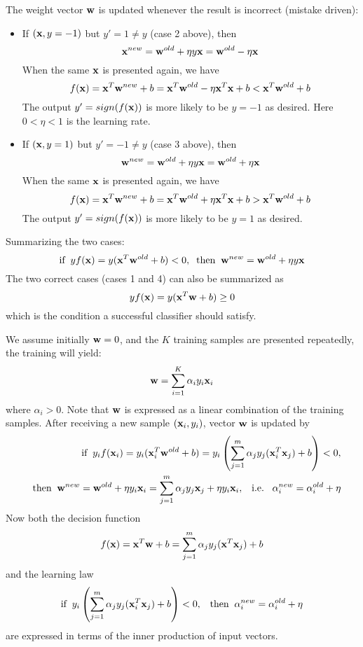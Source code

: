 The weight vector ${\bf w}$ is updated whenever the result is incorrect (mistake
driven):

\begin{itemize} 
\item If $({\bf x},y=-1)$ but $y'=1\ne y$ (case 2 above), then
  \[ {\bf x}^{new}={\bf w}^{old}+\eta y {\bf x}={\bf w}^{old}-\eta {\bf x}	\]
  When the same ${\bf x}$ is presented again, we have
  \[ f({\bf x})={\bf x}^T{\bf w}^{new}+b
  ={\bf x}^T{\bf w}^{old}-\eta {\bf x}^T{\bf x}+b<{\bf x}^T{\bf w}^{old}+b \]
  The output $y'=sign(f({\bf x}))$ is more likely to be $y=-1$ as desired. 
  Here $0 < \eta < 1$ is the learning rate.
\item If $({\bf x},y=1)$ but $y'=-1\ne y$ (case 3 above), then
  \[ {\bf w}^{new}={\bf w}^{old}+\eta y {\bf x}={\bf w}^{old}+\eta {\bf x}	\]
  When the same ${\bf x}$ is presented again, we have
  \[ f({\bf x})={\bf x}^T{\bf w}^{new}+b={\bf x}^T{\bf w}^{old}+\eta {\bf x}^T{\bf x}+b>{\bf x}^T{\bf w}^{old}+b \]
  The output $y'=sign(f({\bf x}))$ is more likely to be $y=1$ as desired.
\end{itemize}
Summarizing the two cases:
\[
\mbox{if} \;\;y f({\bf x})= y ({\bf x}^T{\bf w}^{old}+b)<0,\;\;\mbox{then}\;\;
     {\bf w}^{new}={\bf w}^{old}+\eta y {\bf x}	
\]
The two correct cases (cases 1 and 4) can also be summarized as
\[
y f({\bf x})= y ({\bf x}^T {\bf w}+b)\ge 0	
\]
which is the condition a successful classifier should satisfy.

We assume initially ${\bf w}=0$, and the $K$ training samples are presented
repeatedly, the training will yield:
\[
  {\bf w}=\sum_{i=1}^K \alpha_i y_i {\bf x}_i
\]
where $\alpha_i>0$. Note that ${\bf w}$ is expressed as a linear combination of 
the training samples. After receiving a new sample $({\bf x}_i,y_i)$, vector 
${\bf w}$ is updated by 
\begin{eqnarray}
  && \mbox{if} \;\;y_i f({\bf x}_i)=y_i ({\bf x}_i^T{\bf w}^{old}+b)
  =y_i\left(\sum_{j=1}^m \alpha_j y_j({\bf x}_i^T{\bf x}_j)+b\right)<0,
  \nonumber \\
  && \mbox{then}\;\; {\bf w}^{new}={\bf w}^{old}+\eta y_i {\bf x}_i
  =\sum_{j=1}^m \alpha_j y_j {\bf x}_j+\eta y_i {\bf x}_i,\;\;\;\mbox{i.e.}\;\;\;
  \alpha_i^{new}=\alpha_i^{old}+\eta	\nonumber
\end{eqnarray}
Now both the decision function
\[ 
f({\bf x})={\bf x}^T {\bf w}+b=\sum_{j=1}^m \alpha_j y_j ({\bf x}^T {\bf x}_j)+b	
\]
and the learning law 
\[
\mbox{if} \;\;y_i\left(\sum_{j=1}^m \alpha_j y_j({\bf x}_i^T{\bf x}_j)+b\right)<0,
\;\;\;	\mbox{then}\;\; \alpha_i^{new}=\alpha_i^{old}+\eta	
\]
are expressed in terms of the inner production of input vectors.


